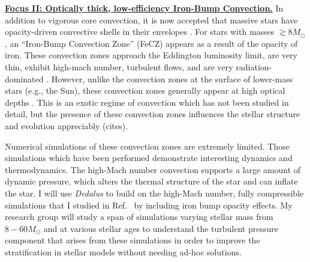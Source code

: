 \documentclass[12pt]{article}
\newcommand{\sct}[1]{\vspace{0.3cm}\hspace{-\parindent}\textbf{\underline{#1}}\hspace{0.3cm}}
\begin{document}
\sct{Focus II: Optically thick, low-efficiency Iron-Bump Convection.}
In addition to vigorous core convection, it is now accepted that massive stars have opacity-driven convective shells in their envelopes \citep{cantiello_etal_2009}.
For stars with masses $\gtrsim 8 M_{\odot}$, an ``Iron-Bump Convection Zone'' (FeCZ) appears as a result of the opacity of iron.
These convection zones approach the Eddington luminosity limit, are very thin, exhibit high-mach number, turbulent flows, and are very radiation-dominated \citep{jermyn_etal_2022_atlas}.
However, unlike the convection zones at the surface of lower-mass stars (e.g., the Sun), these convection zones generally appear at high optical depths \citep[fig 59 of][]{jermyn_etal_2022_atlas}.
This is an exotic regime of convection which has not been studied in detail, but the presence of these convection zones influences the stellar structure and evolution appreciably (cites).


Numerical simulations of these convection zones are extremely limited.
Those simulations which have been performed \citep{jiang_etal_2015, schultz_etal_2020} demonstrate interesting dynamics and thermodynamics.
The high-Mach number convection supports a large amount of dynamic pressure, which alters the thermal structure of the star and can inflate the star.
I will use \emph{Dedalus} to build on the high-Mach number, fully compressible simulations that I studied in Ref.~\citep{anders_brown_2017} by including iron bump opacity effects.
My research group will study a span of simulations varying stellar mass from $8-60 M_{\odot}$ and at various stellar ages to understand the turbulent pressure component that arises from these simulations in order to improve the stratification in stellar models without needing ad-hoc solutions.
\end{document}
